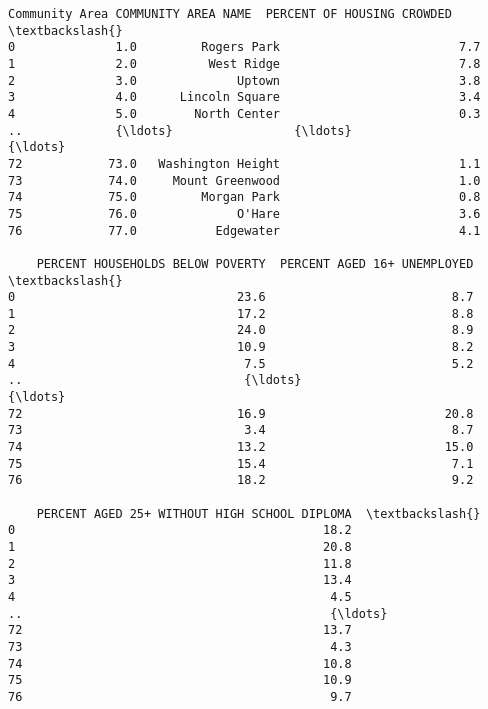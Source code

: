 \documentclass[11pt]{article}
\makeatletter
\newcommand{\boxspacing}{\kern\kvtcb@left@rule\kern\kvtcb@boxsep}
\newcommand{\prompt}[4]{
        \ttfamily\llap{{\color{#2}[#3]:\hspace{3pt}#4}}\vspace{-\baselineskip}
    }
\makeatother
\begin{document}
            \begin{tcolorbox}[breakable, size=fbox, boxrule=.5pt, pad at break*=1mm, opacityfill=0]
\prompt{Out}{outcolor}{118}{\boxspacing}
\begin{Verbatim}[commandchars=\\\{\}]
    Community Area COMMUNITY AREA NAME  PERCENT OF HOUSING CROWDED  \textbackslash{}
0              1.0         Rogers Park                         7.7
1              2.0          West Ridge                         7.8
2              3.0              Uptown                         3.8
3              4.0      Lincoln Square                         3.4
4              5.0        North Center                         0.3
..             {\ldots}                 {\ldots}                         {\ldots}
72            73.0   Washington Height                         1.1
73            74.0     Mount Greenwood                         1.0
74            75.0         Morgan Park                         0.8
75            76.0              O'Hare                         3.6
76            77.0           Edgewater                         4.1

    PERCENT HOUSEHOLDS BELOW POVERTY  PERCENT AGED 16+ UNEMPLOYED  \textbackslash{}
0                               23.6                          8.7
1                               17.2                          8.8
2                               24.0                          8.9
3                               10.9                          8.2
4                                7.5                          5.2
..                               {\ldots}                          {\ldots}
72                              16.9                         20.8
73                               3.4                          8.7
74                              13.2                         15.0
75                              15.4                          7.1
76                              18.2                          9.2

    PERCENT AGED 25+ WITHOUT HIGH SCHOOL DIPLOMA  \textbackslash{}
0                                           18.2
1                                           20.8
2                                           11.8
3                                           13.4
4                                            4.5
..                                           {\ldots}
72                                          13.7
73                                           4.3
74                                          10.8
75                                          10.9
76                                           9.7


\end{Verbatim}
\end{tcolorbox}
\end{document}
